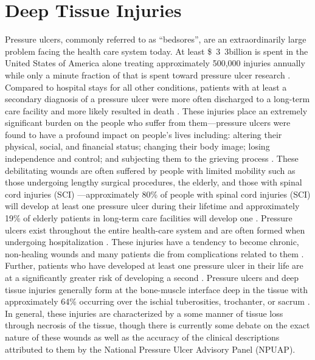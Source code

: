 	\section{Deep Tissue Injuries}
		Pressure ulcers, commonly referred to as ``bedsores'', are an extraordinarily large problem facing the health care system today. At least \unit{\$3.3}{billion} is spent in the United States of America alone treating approximately 500,000 injuries annually \cite{beckrich99,russo08} while only a minute fraction of that is spent toward pressure ulcer research \cite{zanca03}. Compared to hospital stays for all other conditions, patients with at least a secondary diagnosis of a pressure ulcer were more often discharged to a long-term care facility and more likely resulted in death \cite{russo08}. These injuries place an extremely significant burden on the people who suffer from them---pressure ulcers were found to have a profound impact on people's lives including: altering their physical, social, and financial status; changing their body image; losing independence and control; and subjecting them to the grieving process \cite{langemo00,baharestani94}. These debilitating wounds are often suffered by people with limited mobility such as those undergoing lengthy surgical procedures, the elderly, and those with spinal cord injuries (SCI) \cite{allman95}---approximately \unit{80}{\%} of people with spinal cord injuries (SCI) will develop at least one pressure ulcer during their lifetime \cite{salzberg96} and approximately \unit{19}{\%} of elderly patients in long-term care facilities will develop one \cite{freitas11}. Pressure ulcers exist throughout the entire health-care system and are often formed when undergoing hospitalization \cite{aronovitch99}. These injuries have a tendency to become chronic, non-healing wounds and many patients die from complications related to them \cite{jaul10}. Further, patients who have developed at least one pressure ulcer in their life are at a significantly greater risk of developing a second \cite{niazi97}. Pressure ulcers and deep tissue injuries generally form at the bone-muscle interface deep in the tissue \cite{kanno09} with approximately \unit{64}{\%} occurring over the ischial tuberosities, trochanter, or sacrum \cite{garber03}. In general, these injuries are characterized by a some manner of tissue loss through necrosis of the tissue, though there is currently some debate on the exact nature of these wounds as well as the accuracy of the clinical descriptions attributed to them by the National Pressure Ulcer Advisory Panel (NPUAP).

